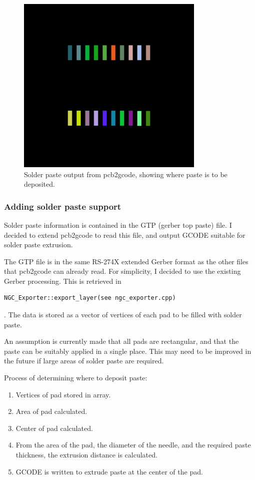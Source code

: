 \documentclass[a4paper,11pt]{article}  %
\begin{document}
\begin{figure}[ht!]
\centering
\includegraphics[width=90mm]{resources/breakout_paste.png}
\caption{Solder paste output from pcb2gcode, showing where paste is to be deposited.}
\label{overflow}
\end{figure}

\subsubsection{Adding solder paste support}
Solder paste information is contained in the GTP (gerber top paste) file. I decided to extend pcb2gcode to read this file, and output GCODE suitable for solder paste extrusion.

The GTP file is in the same RS-274X extended Gerber format as the other files that pcb2gcode can already read. For simplicity, I decided to use the existing Gerber processing.
This is retrieved in \begin{verbatim}NGC_Exporter::export_layer(see ngc_exporter.cpp)\end{verbatim}. The data is stored as a vector of vertices of each pad to be filled with solder paste.

An assumption is currently made that all pads are rectangular, and that the paste can be suitably applied in a single place. This may need to be improved in the future if large areas
of solder paste are required.

Process of determining where to deposit paste:

\begin{enumerate}
	\item	Vertices of pad stored in array.
	\item	Area of pad calculated.
	\item	Center of pad calculated.
	\item	From the area of the pad, the diameter of the needle, and the required paste thickness, the extrusion distance is calculated.
	\item	GCODE is written to extrude paste at the center of the pad.
\end{enumerate}
\end{document}
